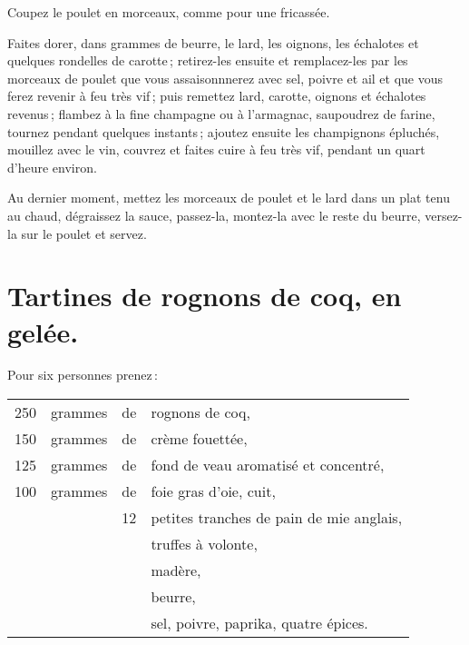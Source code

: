 Coupez le poulet en morceaux, comme pour une fricassée.

Faites dorer, dans {\mmm} grammes de beurre, le lard, les oignons, les échalotes et
quelques rondelles de carotte ; retirez-les ensuite et remplacez-les par les
morceaux de poulet que vous assaisonnnerez avec sel, poivre et ail et que vous
ferez revenir à feu très vif ; puis remettez lard, carotte, oignons et
échalotes revenus ; flambez à la fine champagne ou à l'armagnac, saupoudrez de
farine, tournez pendant quelques instants ; ajoutez ensuite les champignons
épluchés, mouillez avec le vin, couvrez et faites cuire à feu très vif, pendant
un quart d'heure environ.

Au dernier moment, mettez les morceaux de poulet et le lard dans un plat tenu
au chaud, dégraissez la sauce, passez-la, montez-la avec le reste du beurre,
versez-la sur le poulet et servez.

\section*{\centering Tartines de rognons de coq, en gelée.}
{}

Pour six personnes prenez :

\medskip

\footnotesize
\begin{longtable}{rrrp{16em}}
    250 & grammes & de & rognons de coq,                                                                  \\
    150 & grammes & de & crème fouettée,                                                                  \\
    125 & grammes & de & fond de veau aromatisé et concentré,                                             \\
    100 & grammes & de & foie gras d'oie, cuit,                                                           \\
        &         & 12 & petites tranches de pain de mie anglais,                                         \\
        &         &    & truffes à volonte,                                                               \\
        &         &    & madère,                                                                          \\
        &         &    & beurre,                                                                          \\
        &         &    & sel, poivre, paprika, quatre épices.                                             \\
\end{longtable}
\normalsize

